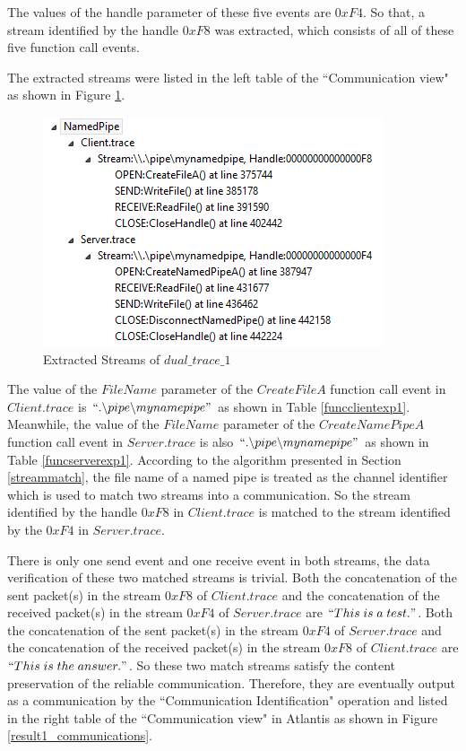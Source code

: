 The values of the handle parameter of these five events are $0xF4$. So that, a stream identified by the handle $0xF8$ was extracted, which consists of all of these five function call events. 

The extracted streams were listed in the left table of the ``Communication view"  as shown in Figure \ref{result1_streams}.

\begin{figure}[H]
\centerline{\includegraphics{Figures/result1_streams}}
 \caption{Extracted Streams of $dual\_trace\_1$}
\label{result1_streams}
\end{figure}

The value of the $FileName$ parameter of the $CreateFileA$ function call event in $Client.trace$ is $``.\backslash pipe \backslash mynamepipe"$ as shown in Table \ref{funcclientexp1}. Meanwhile, the value of the $FileName$ parameter of the $CreateNamePipeA$ function call event in $Server.trace$ is also $``.\backslash pipe \backslash mynamepipe"$ as shown in Table \ref{funcserverexp1}. According to the algorithm presented in Section \ref{streammatch}, the file name of a named pipe is treated as the channel identifier which is used to match two streams into a communication. So the stream identified by the handle $0xF8$ in $Client.trace$ is matched to the stream identified by the $0xF4$ in $Server.trace$.

There is only one send event and one receive event in both streams, the data verification of these two matched streams is trivial. Both the concatenation of the sent packet(s) in the stream $0xF8$ of $Client.trace$ and the concatenation of the received packet(s) in the stream $0xF4$ of $Server.trace$ are $``This\; is\; a\; test."$. Both the concatenation of the sent packet(s) in the stream $0xF4$ of $Server.trace$ and the concatenation of the received packet(s) in the stream $0xF8$ of $Client.trace$ are $``This\; is\; the\; answer."$. So these two match streams satisfy the content preservation of the reliable communication. Therefore, they are eventually output as a communication by the ``Communication Identification" operation and listed in the right table of the ``Communication view" in Atlantis as shown in Figure \ref{result1_communications}.


